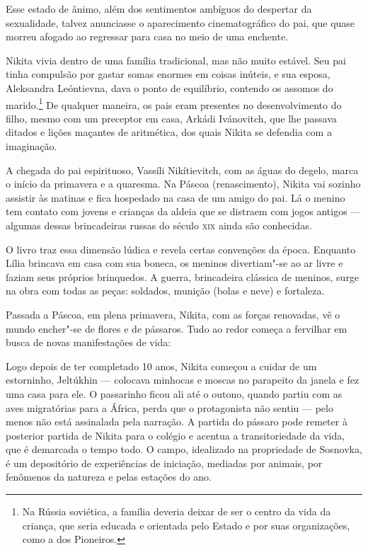 Esse estado de ânimo, além dos sentimentos ambíguos do despertar da
sexualidade, talvez anunciasse o aparecimento cinematográfico do pai,
que quase morreu afogado ao regressar para casa no meio de uma enchente.

Nikita vivia dentro de uma família tradicional, mas não muito estável.
Seu pai tinha compulsão por gastar somas enormes em coisas inúteis, e
sua esposa, Aleksandra Leóntievna, dava o ponto de equilíbrio, contendo
os assomos do marido.\footnote{Na Rússia soviética, a família deveria
  deixar de ser o centro da vida da criança, que seria educada e
  orientada pelo Estado e por suas organizações, como a dos Pioneiros.}
De qualquer maneira, os pais eram presentes no desenvolvimento do filho,
mesmo com um preceptor em casa, Arkádi Ivánovitch, que lhe passava
ditados e lições maçantes de aritmética, dos quais Nikita se defendia
com a imaginação.

A chegada do pai espirituoso, Vassíli Nikítievitch, com as águas do
degelo, marca o início da primavera e a quaresma. Na Páscoa
(renascimento), Nikita vai sozinho assistir às matinas e fica hospedado
na casa de um amigo do pai. Lá o menino tem contato com jovens e
crianças da aldeia que se distraem com jogos antigos --- algumas dessas
brincadeiras russas do século \textsc{xix} ainda são conhecidas.

O livro traz essa dimensão lúdica e revela certas convenções da época.
Enquanto Lília brincava em casa com sua boneca, os meninos divertiam"-se
ao ar livre e faziam seus próprios brinquedos. A guerra, brincadeira
clássica de meninos, surge na obra com todas as peças: soldados, munição
(bolas e neve) e fortaleza.

Passada a Páscoa, em plena primavera, Nikita, com as forças renovadas,
vê o mundo encher"-se de flores e de pássaros. Tudo ao redor começa a
fervilhar em busca de novas manifestações de vida:

\begin{quote}
\end{quote}

Logo depois de ter completado 10 anos, Nikita começou a cuidar de um
estorninho, Jeltúkhin --- colocava minhocas e moscas no parapeito da
janela e fez uma casa para ele. O passarinho ficou ali até o outono,
quando partiu com as aves migratórias para a África, perda que o
protagonista não sentiu --- pelo menos não está assinalada pela
narração. A partida do pássaro pode remeter à posterior partida de
Nikita para o colégio e acentua a transitoriedade da vida, que é
demarcada o tempo todo. O campo, idealizado na propriedade de Sosnovka,
é um depositório de experiências de iniciação, mediadas por animais, por
fenômenos da natureza e pelas estações do ano.

